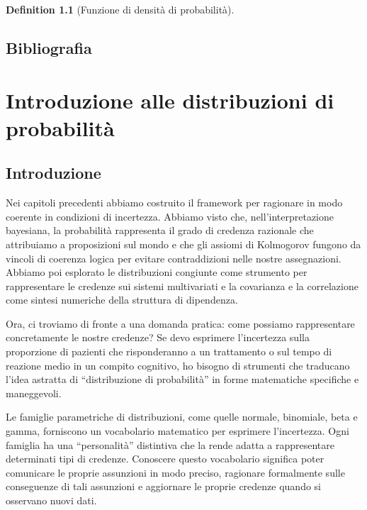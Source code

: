 \documentclass[
  letterpaper,
  DIV=11,
  numbers=noendperiod,
  oneside]{scrreprt}
\theoremstyle{definition}
\theoremstyle{plain}
\theoremstyle{definition}
\newtheorem{definition}{Definition}[chapter]
\theoremstyle{remark}
\begin{document}
\begin{definition}[Funzione di densità di
probabilità]
\begin{tcolorbox}
\end{tcolorbox}

\section*{Bibliografia}\label{bibliografia-6}


\chapter{Introduzione alle distribuzioni di
probabilità}\label{sec-prob-intro-distr}

\section*{Introduzione}\label{introduzione-10}


Nei capitoli precedenti abbiamo costruito il framework per ragionare in
modo coerente in condizioni di incertezza. Abbiamo visto che,
nell'interpretazione bayesiana, la probabilità rappresenta il grado di
credenza razionale che attribuiamo a proposizioni sul mondo e che gli
assiomi di Kolmogorov fungono da vincoli di coerenza logica per evitare
contraddizioni nelle nostre assegnazioni. Abbiamo poi esplorato le
distribuzioni congiunte come strumento per rappresentare le credenze sui
sistemi multivariati e la covarianza e la correlazione come sintesi
numeriche della struttura di dipendenza.

Ora, ci troviamo di fronte a una domanda pratica: come possiamo
rappresentare concretamente le nostre credenze? Se devo esprimere
l'incertezza sulla proporzione di pazienti che risponderanno a un
trattamento o sul tempo di reazione medio in un compito cognitivo, ho
bisogno di strumenti che traducano l'idea astratta di ``distribuzione di
probabilità'' in forme matematiche specifiche e maneggevoli.

Le famiglie parametriche di distribuzioni, come quelle normale,
binomiale, beta e gamma, forniscono un vocabolario matematico per
esprimere l'incertezza. Ogni famiglia ha una ``personalità'' distintiva
che la rende adatta a rappresentare determinati tipi di credenze.
Conoscere questo vocabolario significa poter comunicare le proprie
assunzioni in modo preciso, ragionare formalmente sulle conseguenze di
tali assunzioni e aggiornare le proprie credenze quando si osservano
nuovi dati.


\end{definition}
\end{document}
